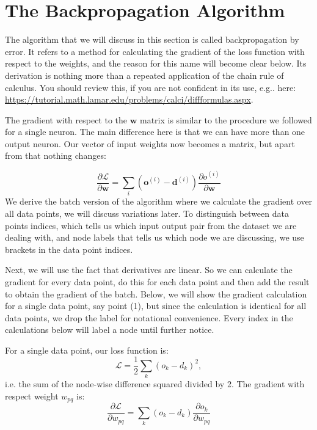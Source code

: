     

    \section{The Backpropagation Algorithm}
    The algorithm that we will discuss in this section is called backpropagation by error. It refers to a method for calculating the gradient of the loss function
    with respect to the weights, and the reason for this name will become clear below. Its derivation is nothing more than a repeated application of the chain rule
    of calculus. You should review this, if you are not confident in its use, e.g.. here: \url{https://tutorial.math.lamar.edu/problems/calci/diffformulas.aspx}.

    The gradient with respect to the $\boldsymbol{w}$ matrix is similar to the procedure we followed for a  single neuron. The main difference here is that
    we can have more than one output neuron. Our vector of input weights now becomes a matrix, but apart from that nothing changes:

    \begin{equation}
      \frac{\partial \mathcal{L}}{\partial \boldsymbol{w}} = \sum_i (\boldsymbol{o}^{(i)} - \boldsymbol{d}^{(i)})\frac{\partial o^{(i)}}{\partial \boldsymbol{w}}
      \label{eq-grad}
    \end{equation}
    We derive the batch version of the algorithm where we calculate the gradient over all data points, we will discuss variations later. To distinguish between
    data points indices, which tells us which input output pair from the dataset we are dealing with, and node labels that tells us which node we are discussing,
    we use brackets in the data point indices.

    Next, we will use the fact that derivatives are linear. So we can calculate the gradient for every data point, do this for each data point and then add the result
    to obtain the gradient of the batch. Below, we will show the gradient calculation for a single data point, say point (1), but since the calculation is identical
    for all data points, we drop the label for notational convenience. Every index in the calculations below will label a node until further notice.

    For a single data point, our loss function is:
    $$
    \mathcal{L} = \frac{1}{2}\sum_k (o_k - d_k)^2,
    $$
    i.e. the sum of the node-wise difference squared divided by 2. The gradient with respect weight $w_{pq}$ is:
    \begin{equation}
      \frac{\partial \mathcal{L}}{\partial w_{pq}} = \sum_k (o_k - d_k)\frac{\partial o_k}{\partial w_{pq}}
      \label{eq-partdiff}
    \end{equation}
    
